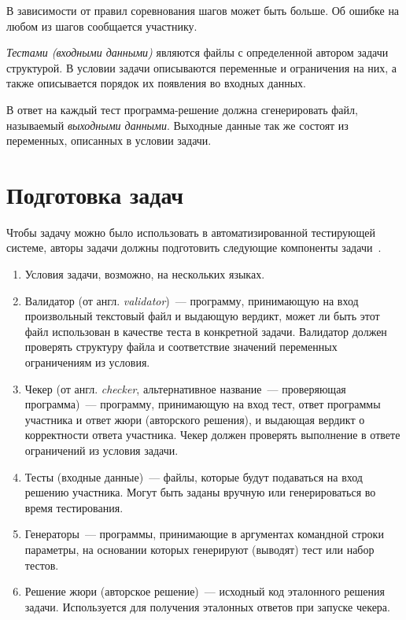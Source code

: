 \documentclass[times,specification,annotation]{style/itmo-student-thesis/itmo-student-thesis}
\begin{document}
В зависимости от правил соревнования шагов может быть больше. Об ошибке на любом из шагов сообщается участнику.

\textit{Тестами (входными данными)} являются файлы с определенной автором задачи структурой. В условии задачи описываются переменные и ограничения на них, а также описывается порядок их появления во входных данных.

В ответ на каждый тест программа-решение должна сгенерировать файл, называемый \textit{выходными данными}. Выходные данные так же состоят из переменных, описанных в условии задачи.

\section{Подготовка задач}

Чтобы задачу можно было использовать в автоматизированной тестирующей системе, авторы задачи должны подготовить следующие компоненты задачи~\cite{darkcyan-polygon-tutorial}.

\begin{enumerate}[leftmargin=1.75cm]
    \item Условия задачи, возможно, на нескольких языках.
    \item Валидатор (от англ. \textit{validator})~--- программу, принимающую на вход произвольный текстовый файл и выдающую вердикт, может ли быть этот файл использован в качестве теста в конкретной задачи. Валидатор должен проверять структуру файла и соответствие значений переменных ограничениям из условия.
    \item Чекер (от англ. \textit{checker}, альтернативное название~--- проверяющая программа)~--- программу, принимающую на вход тест, ответ программы участника и ответ жюри (авторского решения), и выдающая вердикт о корректности ответа участника. Чекер должен проверять выполнение в ответе ограничений из условия задачи.
    \item Тесты (входные данные)~--- файлы, которые будут подаваться на вход решению участника. Могут быть заданы вручную или генерироваться во время тестирования.
    \item Генераторы~--- программы, принимающие в аргументах командной строки параметры, на основании которых генерируют (выводят) тест или набор тестов.
    \item Решение жюри (авторское решение)~--- исходный код эталонного решения задачи. Используется для получения эталонных ответов при запуске чекера.
\end{enumerate}
\end{document}

